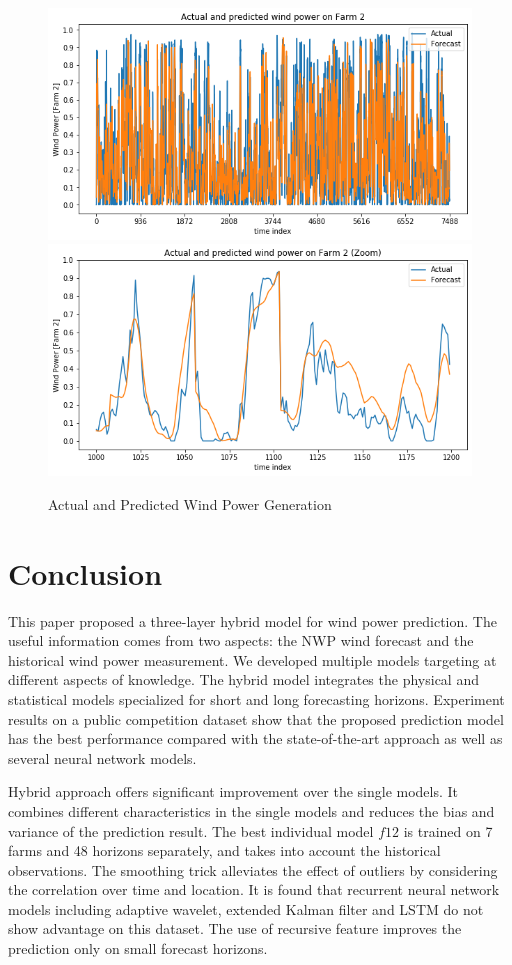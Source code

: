 \documentclass[conference]{IEEEtran}
\begin{document}
\begin{figure}[t]
\centering
\includegraphics[width=0.9\columnwidth]{FIG/actual}
\includegraphics[width=0.9\columnwidth]{FIG/actualzoom}
\caption{Actual and Predicted Wind Power Generation}
\label{fig:actual}
\end{figure}



\section{Conclusion}
This paper proposed a three-layer hybrid model for wind power prediction. The useful information comes from two aspects: the NWP wind forecast and the historical wind power measurement. We developed multiple models targeting at different aspects of knowledge. The hybrid model integrates the physical and statistical models specialized for short and long forecasting horizons. Experiment results on a public competition dataset show that the proposed prediction model has the best performance compared with the state-of-the-art approach as well as several neural network models. 

Hybrid approach offers significant improvement over the single models. It combines different characteristics in the single models and reduces the bias and variance of the prediction result. The best individual model $f12$ is trained on 7 farms and 48 horizons separately, and takes into account the historical observations. The smoothing trick alleviates the effect of outliers by considering the correlation over time and location. It is found that recurrent neural network models including adaptive wavelet, extended Kalman filter and LSTM do not show advantage on this dataset. The use of recursive feature improves the prediction only on small forecast horizons. 
\end{document}
